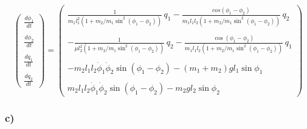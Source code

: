 \documentclass{article}
\begin{document}
\begin{equation*}
    \begin{pmatrix}
        \frac{d\phi_1}{dt} \\
        \\
        \frac{d\phi_2}{dt} \\
        \\
        \frac{dq_1}{dt} \\
        \\
        \frac{dq_2}{dt}
    \end{pmatrix}
    =
    \begin{pmatrix}
        \frac{1}{m_1 l_1^2(1 + m_2/m_1 \sin^2(\phi_1 - \phi_2))} \, q_1 - \frac{cos(\phi_1 - \phi_2)}{m_1l_1l_2(1+m_2/m_1\sin^2(\phi_1 - \phi_2))} \, q_2 \\
        \\
        -\frac{1}{\mu l_2^2(1 + m_2/m_1\sin^2(\phi_1 - \phi_2))} \, q_2 - \frac{\cos(\phi_1 - \phi_2)}{m_1 l_1 l_2 (1+m_2/m_1 \sin^2(\phi_1 - \phi_2))} \, q_1 \\
        \\
        -m_2l_1l_2 \dot \phi_1 \dot \phi_2 \sin(\phi_1 - \phi_2) - (m_1 + m_2)gl_1\sin\phi_1 \\
        \\
        m_2l_1l_2 \dot \phi_1 \dot \phi_2 \sin(\phi_1 - \phi_2) - m_2gl_2 \sin \phi_2
    \end{pmatrix}
\end{equation*}
\subsubsection*{c)}
\end{document}
